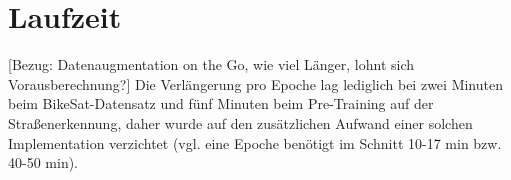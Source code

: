 \section{Laufzeit}

[Bezug: Datenaugmentation on the Go, wie viel Länger, lohnt sich Vorausberechnung?]
Die Verlängerung pro Epoche lag lediglich bei zwei Minuten beim BikeSat-Datensatz und fünf Minuten beim Pre-Training auf der 
Straßenerkennung, daher wurde auf den zusätzlichen Aufwand einer solchen Implementation verzichtet 
(vgl. eine Epoche benötigt im Schnitt 10-17 min bzw. 40-50 min). 




		


